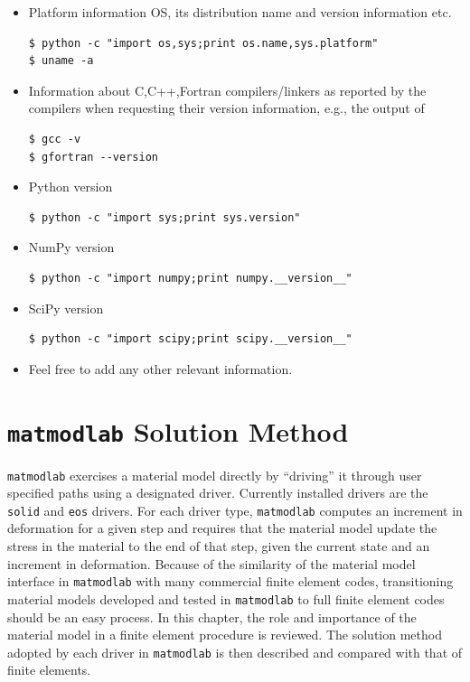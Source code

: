 \documentclass[12pt,report,strict]{SANDreport/SANDreport}
\newcommand{\mml}{\texttt{matmodlab}}
\newcommand{\sol}{\texttt{solid}}
\newcommand{\eos}{\texttt{eos}}
\begin{document}
\begin{itemize}
  \item Platform information OS, its distribution name and version information
  etc.
\begin{verbatim}
$ python -c "import os,sys;print os.name,sys.platform"
$ uname -a
\end{verbatim}

  \item Information about C,C++,Fortran compilers/linkers as reported by the
  compilers when requesting their version information, e.g., the output of
\begin{verbatim}
$ gcc -v
$ gfortran --version
\end{verbatim}

  \item Python version
\begin{verbatim}
$ python -c "import sys;print sys.version"
\end{verbatim}

\item NumPy version
\begin{verbatim}
$ python -c "import numpy;print numpy.__version__"
\end{verbatim}

\item SciPy version
\begin{verbatim}
$ python -c "import scipy;print scipy.__version__"
\end{verbatim}

\item Feel free to add any other relevant information.
\end{itemize}

\chapter{\mml{} Solution Method}
\label{chap:solmeth}
\mml{} exercises a material model directly by ``driving'' it through user
specified paths using a designated driver. Currently installed drivers are the
\sol{} and \eos{} drivers. For each driver type, \mml{} computes an increment
in deformation for a given step and requires that the material model update
the stress in the material to the end of that step, given the current state
and an increment in deformation. Because of the similarity of the material
model interface in \mml{} with many commercial finite element codes,
transitioning material models developed and tested in \mml{} to full finite
element codes should be an easy process. In this chapter, the role and
importance of the material model in a finite element procedure is reviewed.
The solution method adopted by each driver in \mml{} is then described and
compared with that of finite elements.
\end{document}
